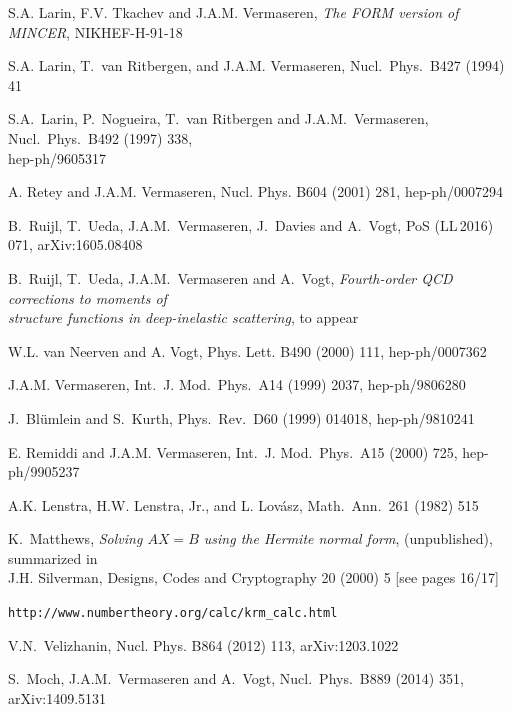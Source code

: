 \documentclass[12pt]{article}
\begin{document}
{\begin{thebibliography}{99}
S.A. Larin, F.V. Tkachev and J.A.M. Vermaseren,
  {\it The FORM version of MINCER},
  NIKHEF-H-91-18

S.A. Larin, T.~van Ritbergen, and J.A.M. Vermaseren,
  Nucl.\ Phys.\ B427 (1994) 41

S.A.~Larin, P.~Nogueira, T.~van Ritbergen and J.A.M.~Vermaseren,
  Nucl.\ Phys.\ B492 (1997) 338,\\[1mm] hep-ph/9605317

A. Retey and J.A.M. Vermaseren,
  Nucl. Phys. B604 (2001) 281, hep-ph/0007294

B.~Ruijl, T.~Ueda, J.A.M.~Vermaseren, J.~Davies and A.~Vogt,
  PoS (LL$\,$2016) 071, arXiv:1605.08408 

B.~Ruijl, T.~Ueda, J.A.M.~Vermaseren and A.~Vogt,
{\it Fourth-order QCD corrections to moments of\\[1mm]
 structure functions in deep-inelastic scattering}, to appear

W.L. van Neerven and A. Vogt,
  Phys. Lett. B490 (2000) 111, hep-ph/0007362

J.A.M. Vermaseren,
  Int.\ J. Mod.\ Phys.\ A14 (1999) 2037, hep-ph/9806280

J.~Bl\"umlein and S.~Kurth,
  Phys.\ Rev.\ D60 (1999) 014018, hep-ph/9810241

E. Remiddi and J.A.M. Vermaseren,
  Int.\ J. Mod.\ Phys.\ A15 (2000) 725, hep-ph/9905237

A.K. Lenstra, H.W. Lenstra, Jr., and L. Lov\'asz,
  Math.\ Ann.\ 261 (1982) 515

K.~Matthews, {\it Solving $AX = B$ using the Hermite normal form},
(unpublished), summarized in \\[1.5mm]
J.H. Silverman, Designs, Codes and Cryptography 20 (2000) 5
[see pages 16/17]

{\tt http://www.numbertheory.org/calc/krm\_calc.html}

V.N.~Velizhanin,
  Nucl. Phys. B864 (2012) 113, arXiv:1203.1022

S.~Moch, J.A.M.~Vermaseren and A.~Vogt,
  Nucl.\ Phys.\ B889 (2014) 351, arXiv:1409.5131


\end{thebibliography}}
\end{document}
